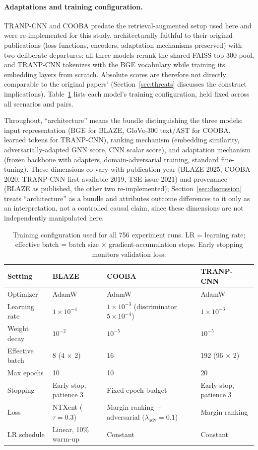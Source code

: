 \documentclass[a4paper,fleqn]{cas-dc}
\begin{document}
\paragraph{Adaptations and training configuration.}
 TRANP-CNN and COOBA predate the retrieval-augmented setup used
here and were re-implemented for this study, architecturally faithful to
their original publications (loss functions, encoders, adaptation
mechanisms preserved) with two deliberate departures: all three models
rerank the shared FAISS top-300 pool, and TRANP-CNN tokenizes with the BGE
vocabulary while training its embedding layers from scratch. Absolute
scores are therefore not directly comparable to the original papers'
(Section~\ref{sec:threats} discusses the construct implications).
Table~\ref{tab:hyperparams} lists each model's training configuration, held
fixed across all scenarios and pairs.

Throughout, ``architecture'' means the bundle distinguishing the three
models: input representation (BGE for BLAZE, GloVe-300 text/AST for COOBA,
learned tokens for TRANP-CNN), ranking mechanism (embedding similarity,
adversarially-adapted GNN score, CNN scalar score), and adaptation
mechanism (frozen backbone with adapters, domain-adversarial training,
standard fine-tuning). These dimensions co-vary with publication year
(BLAZE 2025, COOBA 2020, TRANP-CNN first available 2019, TSE issue 2021)
and provenance (BLAZE as
published, the other two re-implemented); Section~\ref{sec:discussion}
treats ``architecture'' as a bundle and attributes outcome differences to
it only as an interpretation, not a controlled causal claim, since these
dimensions are not independently manipulated here.

\begin{table}[t]
\centering
\caption{Training configuration used for all 756 experiment runs. LR = learning rate;
effective batch = batch size $\times$ gradient-accumulation steps. Early stopping
monitors validation loss.}
\label{tab:hyperparams}
\small
\begin{tabular}{@{}llll@{}}
\toprule
\textbf{Setting} & \textbf{BLAZE} & \textbf{COOBA} & \textbf{TRANP-CNN} \\
\midrule
Optimizer       & AdamW & AdamW & AdamW \\
Learning rate   & $1\times10^{-4}$ & $1\times10^{-3}$ (discriminator $5\times10^{-4}$) & $1\times10^{-3}$ \\
Weight decay    & $10^{-2}$ & $10^{-5}$ & $10^{-5}$ \\
Effective batch & 8 (4 $\times$ 2) & 16 & 192 (96 $\times$ 2) \\
Max epochs      & 10 & 10 & 20 \\
Stopping        & Early stop, patience 3 & Fixed epoch budget & Early stop, patience 3 \\
Loss            & NTXent ($\tau = 0.3$) & Margin ranking $+$ adversarial ($\lambda_\mathrm{adv} = 0.1$) & Margin ranking \\
LR schedule     & Linear, 10\% warm-up & Constant & Constant \\
\bottomrule
\end{tabular}
\end{table}
\end{document}
